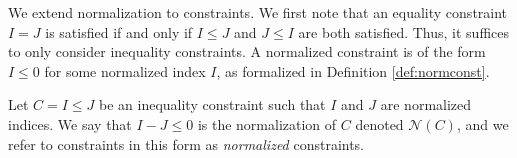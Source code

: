We extend normalization to constraints. We first note that an equality constraint $I = J$ is satisfied if and only if $I \leq J$ and $J \leq I$ are both satisfied. Thus, it suffices to only consider inequality constraints. A normalized constraint is of the form $I \leq 0$ for some normalized index $I$, as formalized in Definition \ref{def:normconst}.
%
\begin{defi}\label{def:normconst}
    Let $C = I \leq J$ be an inequality constraint such that $I$ and $J$ are normalized indices. We say that $I-J \leq 0$ is the normalization of $C$ denoted $\mathcal{N}(C)$, and we refer to constraints in this form as \textit{normalized} constraints.
%
\end{defi}
%
%
%
